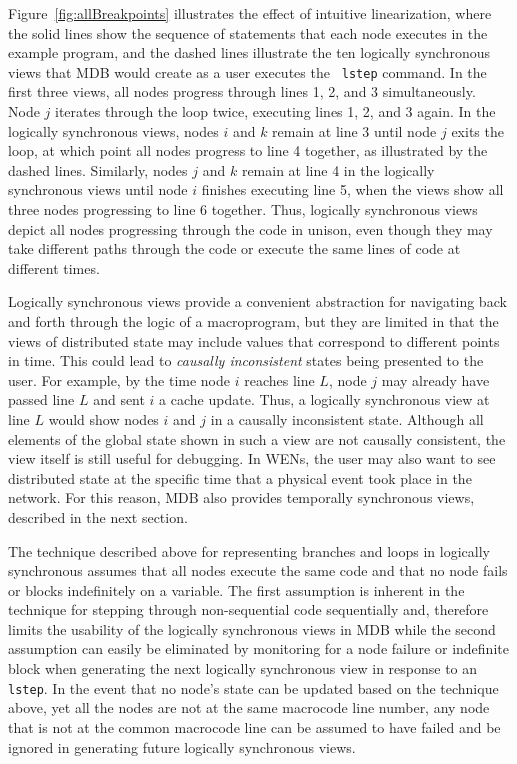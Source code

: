 Figure~\ref{fig:allBreakpoints} illustrates the effect of intuitive
linearization, where the solid lines show the sequence of statements that each
node executes in the example program, and the dashed lines illustrate the ten
logically synchronous views that MDB would create as a user executes the {\tt
  lstep} command.  In the first three views, all nodes progress through lines 1,
2, and 3 simultaneously. Node $j$ iterates through the loop twice, executing
lines 1, 2, and 3 again.  In the logically synchronous views, nodes $i$ and $k$
remain at line 3 until node $j$ exits the loop, at which point all nodes
progress to line 4 together, as illustrated by the dashed lines.  Similarly,
nodes $j$ and $k$ remain at line 4 in the logically synchronous views until node
$i$ finishes executing line 5, when the views show all three nodes progressing
to line 6 together. Thus, logically synchronous views depict all nodes
progressing through the code in unison, even though they may take different
paths through the code or execute the same lines of code at different times.

Logically synchronous views provide a convenient abstraction for navigating back
and forth through the logic of a macroprogram, but they are limited in that the
views of distributed state may include values that correspond to different
points in time. This could lead to {\em causally inconsistent} states being
presented to the user. For example, by the time node $i$ reaches line $L$, node
$j$ may already have passed line $L$ and sent $i$ a cache update. Thus, a
logically synchronous view at line $L$ would show nodes $i$ and $j$ in a
causally inconsistent state. Although all elements of the global state shown in
such a view are not causally consistent, the view itself is still useful for
debugging. In WENs, the user may also want to see distributed state at the
specific time that a physical event took place in the network.  For this reason,
MDB also provides temporally synchronous views, described in the next section.

The technique described above for representing branches and loops in logically
synchronous assumes that all nodes execute the same code and that no node fails
or blocks indefinitely on a variable. The first assumption is inherent in the
technique for stepping through non-sequential code sequentially and, therefore
limits the usability of the logically synchronous views in MDB while the second
assumption can easily be eliminated by monitoring for a node failure or
indefinite block when generating the next logically synchronous view in response
to an {\tt lstep}. In the event that no node's state can be updated based on the
technique above, yet all the nodes are not at the same macrocode line number,
any node that is not at the common macrocode line can be assumed to have failed
and be ignored in generating future logically synchronous views.

